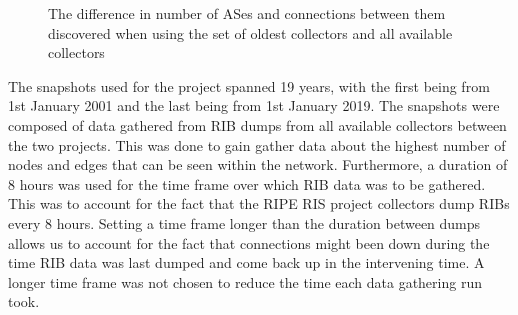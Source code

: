 \documentclass{dissertation/mpaper}
\begin{document}
\begin{figure}
  \centering
  \hfill
  \hfill
  \caption{The difference in number of ASes and connections between them discovered when using the set of oldest collectors and all available collectors}
\end{figure}

The snapshots used for the project spanned 19 years, with the first being from 1st January 2001 and the last being from 1st January 2019. The snapshots were composed of data gathered from RIB dumps from all available collectors between the two projects. This was done to gain gather data about the highest number of nodes and edges that can be seen within the network. Furthermore, a duration of 8 hours was used for the time frame over which RIB data was to be gathered. This was to account for the fact that the RIPE RIS project collectors dump RIBs every 8 hours. Setting a time frame longer than the duration between dumps allows us to account for the fact that connections might been down during the time RIB data was last dumped and come back up in the intervening time. A longer time frame was not chosen to reduce the time each data gathering run took.
\end{document}
